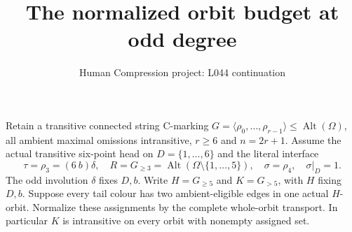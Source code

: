 \documentclass[11pt,a4paper]{article}
\title{The normalized orbit budget at odd degree}
\author{Human Compression project: L044 continuation}
\date{}
\newcommand{\gen}[1]{\langle#1\rangle}
\newcommand{\Alt}{\operatorname{Alt}}
\begin{document}
\maketitle
Retain a transitive connected string C-marking
$G=\gen{\rho_0,\ldots,\rho_{r-1}}\le\Alt(\Omega)$,
all ambient maximal omissions intransitive, $r\ge6$ and
$n=2r+1$. Assume the actual transitive six-point head
on $D=\{1,\ldots,6\}$ and the literal interface
\[
 \tau=\rho_3=(6\ b)\delta,\quad
 R=G_{\ge3}=\Alt(\Omega\setminus\{1,\ldots,5\}),\quad
 \sigma=\rho_4,\quad \sigma|_D=1.
\]
The odd involution $\delta$ fixes $D,b$. Write
$H=G_{\ge5}$ and $K=G_{>5}$, with $H$ fixing $D,b$.
Suppose every tail colour has two ambient-eligible
edges in one actual $H$-orbit. Normalize these
assignments by the complete whole-orbit transport.
In particular $K$ is intransitive on every orbit
with nonempty assigned set.
\end{document}
